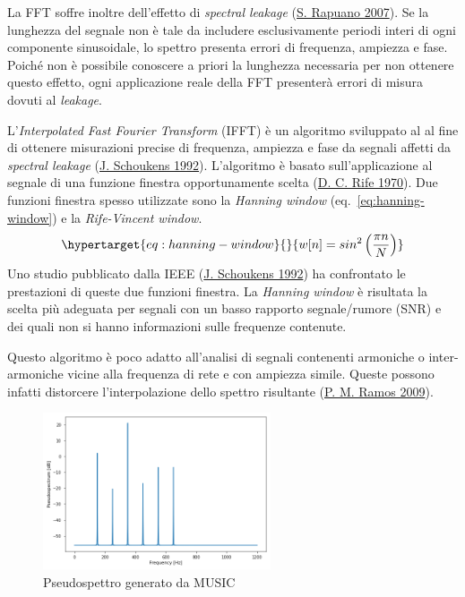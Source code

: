\documentclass[
  italian,
]{article}
\begin{document}
La FFT soffre inoltre dell'effetto di \emph{spectral leakage}
(\protect\hyperlink{ref-fft-time-domain-window}{S. Rapuano 2007}). Se la
lunghezza del segnale non è tale da includere esclusivamente periodi
interi di ogni componente sinusoidale, lo spettro presenta errori di
frequenza, ampiezza e fase. Poiché non è possibile conoscere a priori la
lunghezza necessaria per non ottenere questo effetto, ogni applicazione
reale della FFT presenterà errori di misura dovuti al \emph{leakage}.

L'\emph{Interpolated Fast Fourier Transform} (IFFT) è un algoritmo
sviluppato al al fine di ottenere misurazioni precise di frequenza,
ampiezza e fase da segnali affetti da \emph{spectral leakage}
(\protect\hyperlink{ref-ifft-comp}{J. Schoukens 1992}). L'algoritmo è
basato sull'applicazione al segnale di una funzione finestra
opportunamente scelta (\protect\hyperlink{ref-ifft-original}{D. C. Rife
1970}). Due funzioni finestra spesso utilizzate sono la \emph{Hanning
window} (eq.~\ref{eq:hanning-window}) e la \emph{Rife-Vincent window}.
\begin{equation}\protect\hypertarget{eq:hanning-window}{}{
w[n] = sin^2 \left( \frac{\pi n}{N} \right)
}\label{eq:hanning-window}\end{equation} Uno studio pubblicato dalla
IEEE (\protect\hyperlink{ref-ifft-comp}{J. Schoukens 1992}) ha
confrontato le prestazioni di queste due funzioni finestra. La
\emph{Hanning window} è risultata la scelta più adeguata per segnali con
un basso rapporto segnale/rumore (SNR) e dei quali non si hanno
informazioni sulle frequenze contenute.

Questo algoritmo è poco adatto all'analisi di segnali contenenti
armoniche o inter-armoniche vicine alla frequenza di rete e con ampiezza
simile. Queste possono infatti distorcere l'interpolazione dello spettro
risultante (\protect\hyperlink{ref-alg-comp-quality}{P. M. Ramos 2009}).

\begin{figure}
\hypertarget{fig:music-odd-even}{%
\centering
\includegraphics[width=0.6\textwidth,height=\textheight]{assets/music-odd-even.png}
\caption{Pseudospettro generato da MUSIC}\label{fig:music-odd-even}
}
\end{figure}
\end{document}
